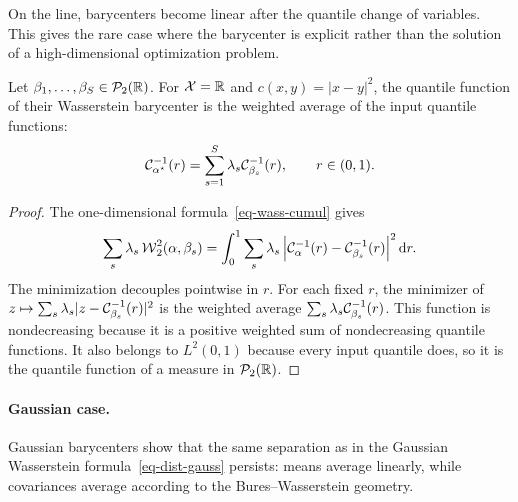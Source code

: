 On the line, barycenters become linear after the quantile change of variables. This gives the rare case where the barycenter is explicit rather than the solution of a high-dimensional optimization problem.

\begin{prop}\label{prop-quantile-barycenters}
	Let $\beta_1,\ldots,\beta_S\in\mathcal{P}_2(\mathbb{R})$. For $\mathcal{X}=\mathbb{R}$ and $c(x,y)=|x-y|^2$, the quantile function of their Wasserstein barycenter is the weighted average of the input quantile functions:
	\[
		\mathcal{C}_{\alpha^\star}^{-1}(r)
		=
		\sum_{s=1}^S\lambda_s\mathcal{C}_{\beta_s}^{-1}(r),
		\qquad r\in(0,1).
	\]
\end{prop}

\begin{proof}
	The one-dimensional formula~\eqref{eq-wass-cumul} gives
	\[
		\sum_s\lambda_s\operatorname{\mathcal{W}}_2^2(\alpha,\beta_s)
		=
		\int_0^1
		\sum_s\lambda_s
		\left\lvert\mathcal{C}_{\alpha}^{-1}(r)-\mathcal{C}_{\beta_s}^{-1}(r)\right\rvert^2
		\mathrm{d} r.
	\]
	The minimization decouples pointwise in $r$. For each fixed $r$, the minimizer of $z\mapsto\sum_s\lambda_s|z-\mathcal{C}_{\beta_s}^{-1}(r)|^2$ is the weighted average $\sum_s\lambda_s\mathcal{C}_{\beta_s}^{-1}(r)$. This function is nondecreasing because it is a positive weighted sum of nondecreasing quantile functions. It also belongs to $L^2(0,1)$ because every input quantile does, so it is the quantile function of a measure in $\mathcal{P}_2(\mathbb{R})$.
\end{proof}


\paragraph{Gaussian case.}

Gaussian barycenters show that the same separation as in the Gaussian Wasserstein formula~\eqref{eq-dist-gauss} persists: means average linearly, while covariances average according to the Bures--Wasserstein geometry.

